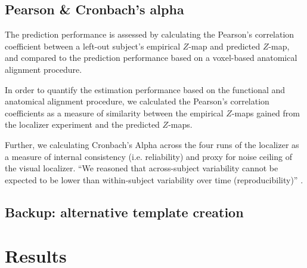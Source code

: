 \subsection{Pearson \& Cronbach's alpha}


%
The prediction performance is assessed by calculating the Pearson's correlation
coefficient between a left-out subject's empirical $Z$-map and predicted
$Z$-map, and compared to the prediction performance based on a voxel-based
anatomical alignment procedure.

In order to quantify the estimation performance based on the functional and
anatomical alignment procedure, we calculated the Pearson's correlation
coefficients as a measure of similarity between the empirical $Z$-maps gained
from the localizer experiment and the predicted $Z$-maps.

Further, we calculating Cronbach's Alpha across the four runs of the localizer
as a measure of internal consistency (i.e.  reliability) and proxy for noise
ceiling of the visual localizer.
%
``We reasoned that across-subject variability cannot be expected to be lower
than within-subject variability over time (reproducibility)''
\citep{rosenke2021probabilistic}.


\subsection{Backup: alternative template creation}








\section{Results}

